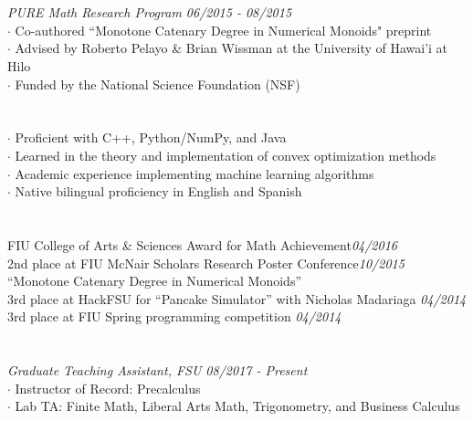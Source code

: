 \documentclass[UTF8, line, margin]{res}
\newcommand{\zh}[1]{\begin{CJK}{UTF8}{gbsn}#1\end{CJK}}
\begin{document}
\begin{resume}

\section{}
\textit{PURE Math Research Program \hfill 06/2015 - 08/2015}\\
$\cdot$ Co-authored ``{\sc Monotone Catenary Degree in Numerical Monoids}" preprint\\
$\cdot$ Advised by Roberto Pelayo \& Brian Wissman at the University of Hawai'i at Hilo\\
$\cdot$ Funded by the National Science Foundation (NSF)

\section{}
$\cdot$ Proficient with C++, Python/NumPy, and Java\\
$\cdot$ Learned in the theory and implementation of convex optimization methods\\
$\cdot$ Academic experience implementing machine learning algorithms\\
$\cdot$ Native bilingual proficiency in English and Spanish

\section{}
FIU College of Arts \& Sciences Award for Math Achievement\textit{\hfill 04/2016}\\
2nd place at FIU McNair Scholars Research Poster Conference\textit{\hfill 10/2015}\\
	\phantom{\hspace{2ex}} ``{\sc Monotone Catenary Degree in Numerical Monoids}''\\
3rd place at HackFSU for ``Pancake Simulator'' with Nicholas Madariaga \textit{\hfill 04/2014}\\
3rd place at FIU Spring programming competition \textit{\hfill 04/2014}

\section{}
\textit{Graduate Teaching Assistant, FSU \hfill 08/2017 - Present}\\
$\cdot$ Instructor of Record: Precalculus\\
$\cdot$ Lab TA: Finite Math, Liberal Arts Math, Trigonometry, and Business Calculus


\end{resume}
\end{document}
